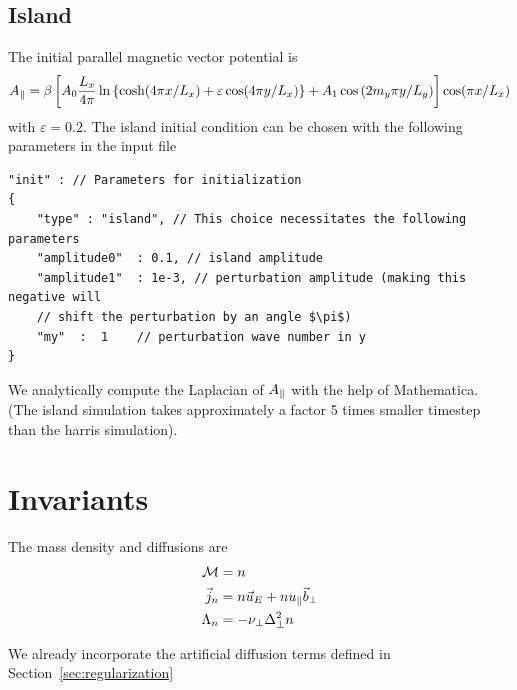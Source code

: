 \subsection{Island}
The initial parallel magnetic vector potential is~\cite{Stanier2015}
\begin{align}
    A_\parallel =\beta \left[ A_0\frac{L_x}{4\pi} \ln \left\{ \cosh( 4\pi x/L_x) + \varepsilon \cos( 4\pi y/L_x)\right\} + A_1\cos{(2m_y \pi y/L_y)}\right] \cos( \pi x /L_x)
\end{align}
with $\varepsilon = 0.2$.
The island initial condition can be chosen with the following parameters in the input file
\begin{verbatim}
"init" : // Parameters for initialization
{
    "type" : "island", // This choice necessitates the following parameters
    "amplitude0"  : 0.1, // island amplitude
    "amplitude1"  : 1e-3, // perturbation amplitude (making this negative will
    // shift the perturbation by an angle $\pi$)
    "my"  :  1    // perturbation wave number in y
}
\end{verbatim}
We analytically compute the Laplacian of $A_\parallel$ with the help of Mathematica.
(The island simulation takes approximately a factor 5 times smaller timestep than
the harris simulation).

\section{Invariants}
The mass density and diffusions are
\begin{align}
    \mathcal M &= n  \\
    \vec j_n &= n  \vec u_E + n u_\parallel \vec b_\perp \\
     \Lambda_n &= -\nu_\perp \Delta_\perp^2 n 
\end{align}
\begin{tcolorbox}[title=Note]
    We already incorporate the artificial diffusion terms defined in
    Section~\ref{sec:regularization}
\end{tcolorbox}

